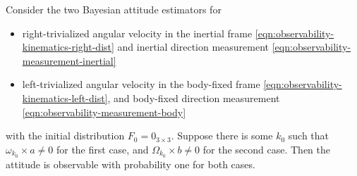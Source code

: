 \begin{theorem} \label{thm:observability-obs}
	Consider the two Bayesian attitude estimators for
	\begin{itemize}
		\item right-trivialized angular velocity in the inertial frame \eqref{eqn:observability-kinematics-right-dist} and inertial direction measurement \eqref{eqn:observability-measurement-inertial} 
		\item left-trivialized angular velocity in the body-fixed frame \eqref{eqn:observability-kinematics-left-dist}, and body-fixed direction measurement \eqref{eqn:observability-measurement-body}  
	\end{itemize}
	with the initial distribution $F_0=0_{3\times 3}$.
	Suppose there is some $k_0$ such that $\omega_{k_0} \times a \neq 0$ for the first case, and $\Omega_{k_0} \times b \neq 0$ for the second case. Then the attitude is observable with probability one for both cases.
\end{theorem}
